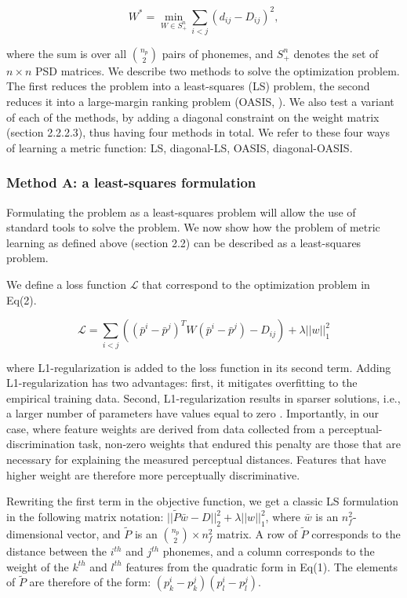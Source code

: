 \begin{equation}
    W^\ast = \min_{W \in S^n_+}{{\sum_{{i} < {j}}{(d_{ij} - D_{ij})^2}}},
\end{equation}

where the sum is over all ${n_p \choose 2}$ pairs of phonemes, and $S^n_+$ denotes the set of $n \times n$ PSD matrices. We describe two methods to solve the optimization problem. The first reduces the problem into a least-squares (LS) problem, the second reduces it into a large-margin ranking problem (OASIS, \citet{Chechik2010}). We also test a variant of each of the methods, by adding a diagonal constraint on the weight matrix (section 2.2.2.3), thus having four methods in total. We refer to these four ways of learning a metric function: LS, diagonal-LS, OASIS, diagonal-OASIS.

\subsubsection{Method A: a least-squares formulation}
Formulating the problem as a least-squares problem will allow the use of standard tools to solve the problem. We now show how the problem of metric learning as defined above (section 2.2) can be described as a least-squares problem. 

We define a loss function $\mathcal{L}$ that correspond to the optimization problem in Eq(2).

\begin{equation}
    \mathcal{L} = \sum_{{i} < {j}}{((\bar{p}^i - \bar{p}^j)^TW(\bar{p}^i - \bar{p}^j) - D_{ij})} + \lambda||w||_1^2
\end{equation}

where L1-regularization is added to the loss function in its second term. Adding L1-regularization has two advantages: first, it mitigates overfitting to the empirical training data. Second, L1-regularization results in sparser solutions, i.e., a larger number of parameters have values equal to zero \citep{Tibshirani1996}. Importantly, in our case, where feature weights are derived from data collected from a perceptual-discrimination task, non-zero weights that endured this penalty are those that are necessary for explaining the measured perceptual distances. Features that have higher weight are therefore more perceptually discriminative. 

Rewriting the first term in the objective function, we get a classic LS formulation in the following matrix notation: $||\widetilde{P}\bar{w} - D||_2^2 + \lambda||w||_1^2$, where $\bar{w}$ is an $n_f^2$-dimensional vector, and $\widetilde{P}$ is an ${n_p \choose 2} \times n_f^2$ matrix. A row of $\widetilde{P}$ corresponds to the distance between the $i^{th}$ and $j^{th}$ phonemes, and a column corresponds to the weight of the $k^{th}$ and $l^{th}$ features from the quadratic form in Eq(1). The elements of $\widetilde{P}$ are therefore of the form: $(p_k^i-p_k^j)(p_l^i-p_l^j)$.

